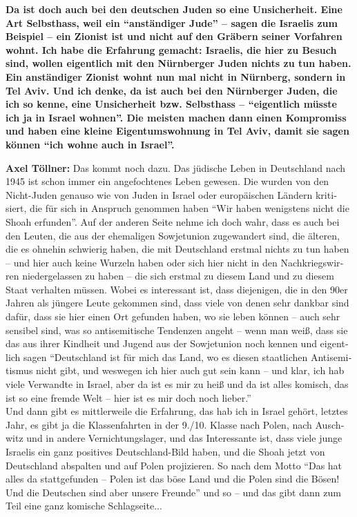 \begin{otherlanguage}{ngerman}
\textbf{Da ist doch auch bei den deutschen Juden so eine Unsicherheit. Eine Art Selbsthass, weil ein "`anständiger Jude"' – sagen die Israelis zum Beispiel – ein Zionist ist und nicht auf den Gräbern seiner Vorfahren wohnt. Ich habe die Erfahrung gemacht: Israelis, die hier zu Besuch sind, wollen eigentlich mit den Nürnberger Juden nichts zu tun haben. Ein anständiger Zionist wohnt nun mal nicht in Nürnberg, sondern in Tel Aviv. Und ich denke, da ist auch bei den Nürnberger Juden, die ich so kenne, eine Unsicherheit bzw. Selbsthass – "`eigentlich müsste ich ja in Israel wohnen"'. Die meisten machen dann einen Kompromiss und haben eine kleine Eigentumswohnung in Tel Aviv, damit sie sagen können "`ich wohne auch in Israel"'.}  

\textbf{Axel Töllner:} Das kommt noch dazu. Das jüdische Leben in Deutschland nach 1945 ist schon immer ein angefochtenes Leben gewesen. Die wurden von den Nicht-Juden genauso wie von Juden in Israel oder europäischen Ländern kritisiert, die für sich in Anspruch genommen haben "`Wir haben wenigstens nicht die Shoah erfunden"'. Auf der anderen Seite nehme ich doch wahr, dass es auch bei den Leuten, die aus der ehemaligen Sowjetunion zugewandert sind, die älteren, die es ohnehin schwierig haben, die mit Deutschland erstmal nichts zu tun haben – und hier auch keine Wurzeln haben oder sich hier nicht in den Nachkriegswirren niedergelassen zu haben – die sich erstmal zu diesem Land und zu diesem Staat verhalten müssen. Wobei es interessant ist, dass diejenigen, die in den 90er Jahren als jüngere Leute gekommen sind, dass viele von denen sehr dankbar sind dafür, dass sie hier einen Ort gefunden haben, wo sie leben können – auch sehr sensibel sind, was so antisemitische Tendenzen angeht – wenn man weiß, dass sie das aus ihrer Kindheit und Jugend aus der Sowjetunion noch kennen und eigentlich sagen "`Deutschland ist für mich das Land, wo es diesen staatlichen Antisemitismus nicht gibt, und weswegen ich hier auch gut sein kann – und klar, ich hab viele Verwandte in Israel, aber da ist es mir zu heiß und da ist alles komisch, das ist so eine fremde Welt – hier ist es mir doch noch lieber."' \\ Und dann gibt es mittlerweile die Erfahrung, das hab ich in Israel gehört, letztes Jahr, es gibt ja die Klassenfahrten in der 9./10. Klasse nach Polen, nach Auschwitz und in andere Vernichtungslager, und das Interessante ist, dass viele junge Israelis ein ganz positives Deutschland-Bild haben, und die Shoah jetzt von Deutschland abspalten und auf Polen projizieren. So nach dem Motto "`Das hat alles da stattgefunden – Polen ist das böse Land und die Polen sind die Bösen! Und die Deutschen sind aber unsere Freunde"' und so – und das gibt dann zum Teil eine ganz komische Schlagseite... 


\end{otherlanguage}
